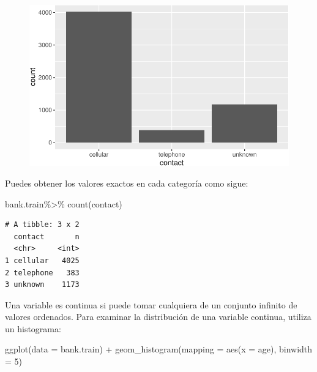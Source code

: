 \documentclass[
  letterpaper,
  DIV=11,
  numbers=noendperiod]{scrreprt}
\newenvironment{Shaded}{\begin{snugshade}}{\end{snugshade}}
\newcommand{\AttributeTok}[1]{\textcolor[rgb]{0.40,0.45,0.13}{#1}}
\newcommand{\DecValTok}[1]{\textcolor[rgb]{0.68,0.00,0.00}{#1}}
\newcommand{\FunctionTok}[1]{\textcolor[rgb]{0.28,0.35,0.67}{#1}}
\newcommand{\NormalTok}[1]{\textcolor[rgb]{0.00,0.23,0.31}{#1}}
\newcommand{\SpecialCharTok}[1]{\textcolor[rgb]{0.37,0.37,0.37}{#1}}
\begin{document}
\begin{figure}[H]

{\centering \includegraphics{eda_files/figure-pdf/unnamed-chunk-8-1.pdf}

}

\end{figure}

Puedes obtener los valores exactos en cada categoría como sigue:

\begin{Shaded}
\begin{Highlighting}[]
\NormalTok{bank.train}\SpecialCharTok{\%\textgreater{}\%} 
  \FunctionTok{count}\NormalTok{(contact)}
\end{Highlighting}
\end{Shaded}

\begin{verbatim}
# A tibble: 3 x 2
  contact       n
  <chr>     <int>
1 cellular   4025
2 telephone   383
3 unknown    1173
\end{verbatim}

Una variable es continua si puede tomar cualquiera de un conjunto
infinito de valores ordenados. Para examinar la distribución de una
variable continua, utiliza un histograma:

\begin{Shaded}
\begin{Highlighting}[]
\FunctionTok{ggplot}\NormalTok{(}\AttributeTok{data =}\NormalTok{ bank.train) }\SpecialCharTok{+}
  \FunctionTok{geom\_histogram}\NormalTok{(}\AttributeTok{mapping =} \FunctionTok{aes}\NormalTok{(}\AttributeTok{x =}\NormalTok{ age), }\AttributeTok{binwidth =} \DecValTok{5}\NormalTok{)}
\end{Highlighting}
\end{Shaded}
\end{document}
